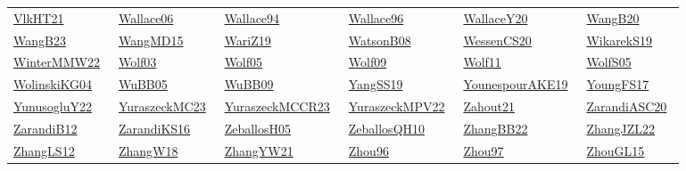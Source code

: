 \begin{longtable}{*{6}{l}}
\href{works/VlkHT21.pdf}{VlkHT21}~\cite{VlkHT21} & \href{works/Wallace06.pdf}{Wallace06}~\cite{Wallace06} & \href{}{Wallace94}~\cite{Wallace94} & \href{works/Wallace96.pdf}{Wallace96}~\cite{Wallace96} & \href{works/WallaceY20.pdf}{WallaceY20}~\cite{WallaceY20} & \href{works/WangB20.pdf}{WangB20}~\cite{WangB20}\\ 
\href{works/WangB23.pdf}{WangB23}~\cite{WangB23} & \href{works/WangMD15.pdf}{WangMD15}~\cite{WangMD15} & \href{}{WariZ19}~\cite{WariZ19} & \href{works/WatsonB08.pdf}{WatsonB08}~\cite{WatsonB08} & \href{works/WessenCS20.pdf}{WessenCS20}~\cite{WessenCS20} & \href{works/WikarekS19.pdf}{WikarekS19}~\cite{WikarekS19}\\ 
\href{works/WinterMMW22.pdf}{WinterMMW22}~\cite{WinterMMW22} & \href{works/Wolf03.pdf}{Wolf03}~\cite{Wolf03} & \href{works/Wolf05.pdf}{Wolf05}~\cite{Wolf05} & \href{works/Wolf09.pdf}{Wolf09}~\cite{Wolf09} & \href{works/Wolf11.pdf}{Wolf11}~\cite{Wolf11} & \href{works/WolfS05.pdf}{WolfS05}~\cite{WolfS05}\\ 
\href{works/WolinskiKG04.pdf}{WolinskiKG04}~\cite{WolinskiKG04} & \href{works/WuBB05.pdf}{WuBB05}~\cite{WuBB05} & \href{works/WuBB09.pdf}{WuBB09}~\cite{WuBB09} & \href{works/YangSS19.pdf}{YangSS19}~\cite{YangSS19} & \href{works/YounespourAKE19.pdf}{YounespourAKE19}~\cite{YounespourAKE19} & \href{works/YoungFS17.pdf}{YoungFS17}~\cite{YoungFS17}\\ 
\href{works/YunusogluY22.pdf}{YunusogluY22}~\cite{YunusogluY22} & \href{works/YuraszeckMC23.pdf}{YuraszeckMC23}~\cite{YuraszeckMC23} & \href{works/YuraszeckMCCR23.pdf}{YuraszeckMCCR23}~\cite{YuraszeckMCCR23} & \href{works/YuraszeckMPV22.pdf}{YuraszeckMPV22}~\cite{YuraszeckMPV22} & \href{works/Zahout21.pdf}{Zahout21}~\cite{Zahout21} & \href{works/ZarandiASC20.pdf}{ZarandiASC20}~\cite{ZarandiASC20}\\ 
\href{}{ZarandiB12}~\cite{ZarandiB12} & \href{works/ZarandiKS16.pdf}{ZarandiKS16}~\cite{ZarandiKS16} & \href{works/ZeballosH05.pdf}{ZeballosH05}~\cite{ZeballosH05} & \href{works/ZeballosQH10.pdf}{ZeballosQH10}~\cite{ZeballosQH10} & \href{works/ZhangBB22.pdf}{ZhangBB22}~\cite{ZhangBB22} & \href{works/ZhangJZL22.pdf}{ZhangJZL22}~\cite{ZhangJZL22}\\ 
\href{works/ZhangLS12.pdf}{ZhangLS12}~\cite{ZhangLS12} & \href{works/ZhangW18.pdf}{ZhangW18}~\cite{ZhangW18} & \href{works/ZhangYW21.pdf}{ZhangYW21}~\cite{ZhangYW21} & \href{works/Zhou96.pdf}{Zhou96}~\cite{Zhou96} & \href{works/Zhou97.pdf}{Zhou97}~\cite{Zhou97} & \href{works/ZhouGL15.pdf}{ZhouGL15}~\cite{ZhouGL15}\\ 

\end{longtable}
